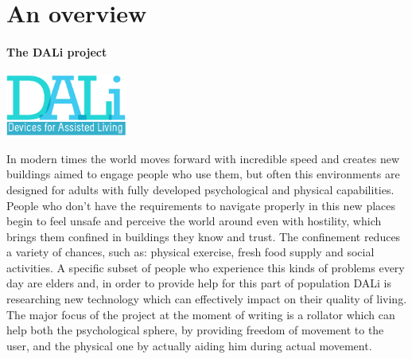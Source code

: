 \chapter{An overview}

\vspace{0.5cm}
\subsubsection{The DALi project}

\vspace{1cm}
\begin{center}
      \includegraphics[width=0.3\textwidth]{img/Dali-logo.png}
\end{center}
\vspace{1cm}

In modern times the world moves forward with incredible speed and creates new buildings aimed to engage people who use them, but often this environments are designed for adults with fully developed psychological and physical capabilities.
People who don't have the requirements to navigate properly in this new places begin to feel unsafe and perceive the world around even with hostility, which brings them confined in buildings they know and trust.
The confinement reduces a variety of chances, such as: physical exercise,
fresh food supply and social activities.
\newline
A specific subset of people who experience this kinds of problems every day are elders and, in order to provide help for this part of population DALi is researching new technology which can effectively impact on their quality of living.
\newline
The major focus of the project at the moment of writing is a rollator which can help both the psychological sphere, by providing freedom of movement to the user, and the physical one by actually aiding him during actual movement.

\newpage
